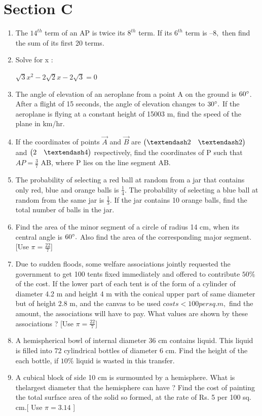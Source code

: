 \documentclass[journal,12pt,twocolumn]{IEEEtran}
\renewcommand\thesection{\arabic{section}}
\begin{document}
\section{Section C}
\renewcommand{\theequation}{\theenumi}
\begin{enumerate}[label=\thesection.\arabic*.,ref=\thesection.\theenumi]
\item The $14^{th}$ term of an AP is twice its $8^{th}$ term. If its $6^{th}$ term is $– 8,$ then find the sum of its first 20 terms.
\item Solve for x : \\
 \begin{center}
     $\sqrt{3}x^2 -2\sqrt{2}x-2\sqrt{3}= 0 $
 \end{center}
 \item The angle of elevation of an aeroplane from a point A on the ground is $60 \degree  $. After a flight of 15 seconds, the angle of elevation changes to $  30 \degree.$ If the aeroplane is flying at a constant height of 15003 m, find the speed of the plane in km/hr.
 \item If the coordinates of points $\vec{A}$ and $\vec{B}$ are $\myvec{– 2 &– 2}$ and $\myvec{2&–4}$ respectively, find the coordinates of P such that $AP =\frac{3}{7}$ AB, where P lies on the line segment AB.
 \item The probability of selecting a red ball at random from a jar that contains only red, blue and orange balls is $\frac{1}{4}.$ The probability of selecting a blue ball at random from the same jar is $\frac{1}{3}.$ If the jar contains 10 orange balls, find the total number of balls in the jar.
 \item Find the area of the minor segment of a circle of radius 14 cm, when its central angle is $60 \degree.$ Also find the area of the corresponding major segment. [Use $\pi =\frac{22}{7}$]
 \item Due to sudden floods, some welfare associations jointly requested the government to get 100 tents fixed immediately and offered to contribute $ 50\% $ of the cost. If the lower part of each tent is of the form of a cylinder of diameter 4.2 m and height 4 m with the conical upper part of same diameter but of height 2.8 m, and the canvas to be used $costs < 100 per sq. m,$ find the amount, the associations will have to pay. What values are shown by these associations ? [Use $\pi=\frac{22}{7}$]
 \item A hemispherical bowl of internal diameter 36 cm contains liquid. This liquid is filled into 72 cylindrical bottles of diameter 6 cm. Find the height of the each bottle, if $10 \% $ liquid is wasted in this transfer.
 \item A cubical block of side 10 cm is surmounted by a hemisphere. What is thelargest diameter that the hemisphere can have ? Find the cost of painting the total surface area of the solid so formed, at the rate of Rs. 5 per 100 sq. cm.[ Use $\pi= 3.14$ ]
\end{enumerate}
\end{document}
